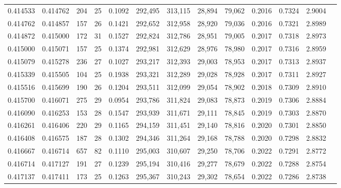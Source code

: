 \begin{tabular}{rrrrrrrrrrrrr}
0.414533 & 0.414762 &    204 &    25 &                                     0.1092 & 292,495 & 313,115 &  28,894 &  79,062 & 0.2016 & 0.7324 & 2.9004 \\
0.414762 & 0.414857 &    157 &    26 &                                     0.1421 & 292,652 & 312,958 &  28,920 &  79,036 & 0.2016 & 0.7321 & 2.8989 \\
0.414872 & 0.415000 &    172 &    31 &                                     0.1527 & 292,824 & 312,786 &  28,951 &  79,005 & 0.2017 & 0.7318 & 2.8973 \\
0.415000 & 0.415071 &    157 &    25 &                                     0.1374 & 292,981 & 312,629 &  28,976 &  78,980 & 0.2017 & 0.7316 & 2.8959 \\
0.415079 & 0.415278 &    236 &    27 &                                     0.1027 & 293,217 & 312,393 &  29,003 &  78,953 & 0.2017 & 0.7313 & 2.8937 \\
0.415339 & 0.415505 &    104 &    25 &                                     0.1938 & 293,321 & 312,289 &  29,028 &  78,928 & 0.2017 & 0.7311 & 2.8927 \\
0.415516 & 0.415699 &    190 &    26 &                                     0.1204 & 293,511 & 312,099 &  29,054 &  78,902 & 0.2018 & 0.7309 & 2.8910 \\
0.415700 & 0.416071 &    275 &    29 &                                     0.0954 & 293,786 & 311,824 &  29,083 &  78,873 & 0.2019 & 0.7306 & 2.8884 \\
0.416090 & 0.416253 &    153 &    28 &                                     0.1547 & 293,939 & 311,671 &  29,111 &  78,845 & 0.2019 & 0.7303 & 2.8870 \\
0.416261 & 0.416406 &    220 &    29 &                                     0.1165 & 294,159 & 311,451 &  29,140 &  78,816 & 0.2020 & 0.7301 & 2.8850 \\
0.416408 & 0.416575 &    187 &    28 &                                     0.1302 & 294,346 & 311,264 &  29,168 &  78,788 & 0.2020 & 0.7298 & 2.8832 \\
0.416667 & 0.416714 &    657 &    82 &                                     0.1110 & 295,003 & 310,607 &  29,250 &  78,706 & 0.2022 & 0.7291 & 2.8772 \\
0.416714 & 0.417127 &    191 &    27 &                                     0.1239 & 295,194 & 310,416 &  29,277 &  78,679 & 0.2022 & 0.7288 & 2.8754 \\
0.417137 & 0.417411 &    173 &    25 &                                     0.1263 & 295,367 & 310,243 &  29,302 &  78,654 & 0.2022 & 0.7286 & 2.8738 \\

\end{tabular}
